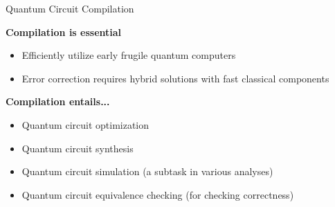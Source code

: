 \begin{frame}{Quantum Circuit Compilation}


	\begin{block}{\bf Compilation is essential}
		\begin{itemize}
		\item Efficiently utilize early frugile quantum computers
		\item Error correction requires hybrid solutions with fast classical components
		\end{itemize}
	\end{block}

\pause
\vspace{-.5em}

	\begin{block}{\bf Compilation entails...}
		\begin{itemize}%
		\item<+-> Quantum circuit optimization
		\item<+-> Quantum circuit synthesis
		\item<+-> {\color{OliveGreen} Quantum circuit simulation}			\hfill (a subtask in various analyses)
		\item<+-> {\color{red} Quantum circuit equivalence checking}  \hfill (for checking correctness)%
		\end{itemize}
	\end{block}

\vspace{-.8em}


\end{frame}
